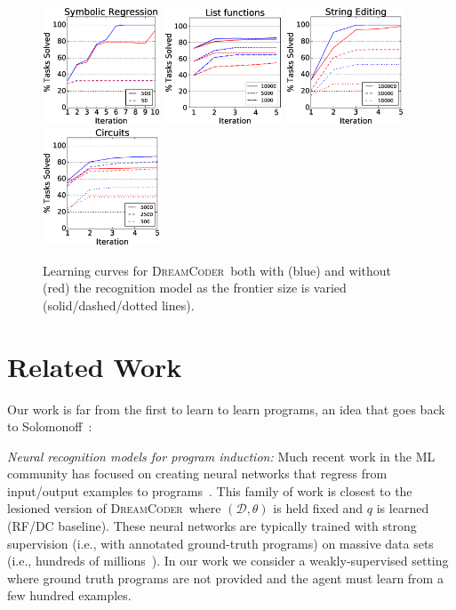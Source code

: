\documentclass{article}
\newcommand{\system}{\textsc{DreamCoder}~}
\begin{document}
\begin{figure}\centering
\includegraphics[width = 3.5cm]{figures/regression.eps} 
  \includegraphics[width = 3.5cm]{figures/list.eps}
  \includegraphics[width = 3.5cm]{figures/textLearningCurve.eps}        
  \includegraphics[width = 3.5cm]{figures/circuitLearningCurve.eps}  
  \caption{Learning curves for \system both with (blue) and without (red) the recognition model as the frontier size is varied (solid/dashed/dotted lines).}\label{learningCurves} 
\end{figure}

 \section{Related Work}
 Our work is far from the first to learn to learn programs,
 an  idea that goes back to Solomonoff~\cite{solomonoff1989system}:

 \noindent \emph{Neural recognition models for program induction:} Much recent work in the ML community has
 focused on creating neural networks that regress from
 input/output examples to programs~\cite{devlin2017robustfill,devlin2017neural,menon2013machine,balog2016deepcoder}. This family of work is closest to the lesioned version of
 \system where $(\mathcal{D},\theta)$ is held fixed and $q$ is learned (RF/DC baseline).
 These neural networks are typically trained with strong supervision (i.e., with annotated ground-truth programs) on massive data sets (i.e., hundreds of millions~\cite{devlin2017robustfill}).
 In our work we consider a weakly-supervised setting where ground truth programs are not provided and
 the agent must learn from a few hundred examples.
 
\end{document}
